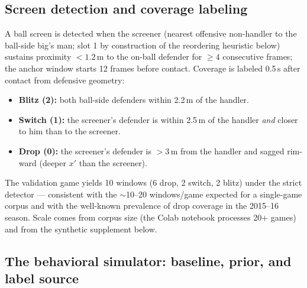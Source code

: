 \documentclass[11pt]{article}
\begin{document}
\subsection{Screen detection and coverage labeling}
\label{sec:labels}

A ball screen is detected when the screener (nearest offensive non-handler to
the ball-side big's man; slot 1 by construction of the reordering heuristic
below) sustains proximity $< 1.2$\,m to the on-ball defender for $\ge 4$
consecutive frames; the anchor window starts 12 frames before contact.
Coverage is labeled 0.5\,s after contact from defensive geometry:

\begin{itemize}[leftmargin=*,itemsep=1pt]
  \item \textbf{Blitz (2):} both ball-side defenders within 2.2\,m of the handler.
  \item \textbf{Switch (1):} the screener's defender is within 2.5\,m of the
        handler \emph{and} closer to him than to the screener.
  \item \textbf{Drop (0):} the screener's defender is $>3$\,m from the handler
        and sagged rim-ward (deeper $x'$ than the screener).
\end{itemize}
The validation game yields 10 windows (6 drop, 2 switch, 2 blitz) under the
strict detector --- consistent with the $\sim$10--20 windows/game expected for
a single-game corpus and with the well-known prevalence of drop coverage in
the 2015--16 season. Scale comes from corpus size (the Colab notebook
processes 20+ games) and from the synthetic supplement below.

\subsection{The behavioral simulator: baseline, prior, and label source}
\label{sec:sim}
\end{document}
